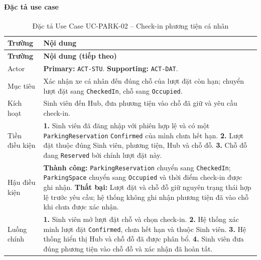 \paragraph{Đặc tả use case}
\small
\begin{longtable}{|L{26mm}|L{118mm}|}
  \caption{Đặc tả Use Case UC-PARK-02 -- Check-in phương tiện cá nhân}\label{tab:spec-UC-PARK-02}\\
  \hline
  \centering\arraybackslash\textbf{Trường} & \centering\arraybackslash\textbf{Nội dung}\\
  \hline
  \endfirsthead
  \hline
  \centering\arraybackslash\textbf{Trường} & \centering\arraybackslash\textbf{Nội dung (tiếp theo)}\\
  \hline
  \endhead
  Actor & \textbf{Primary:} \texttt{ACT-STU}. \textbf{Supporting:} \texttt{ACT-DAT}.\\\hline
  Mục tiêu & Xác nhận xe cá nhân đến đúng chỗ của lượt đặt còn hạn; chuyển lượt đặt sang \texttt{CheckedIn}, chỗ sang \texttt{Occupied}.\\\hline
  Kích hoạt & Sinh viên đến Hub, đưa phương tiện vào chỗ đã giữ và yêu cầu check-in.\\\hline
  Tiền điều kiện &
    \textbf{1.} Sinh viên đã đăng nhập với phiên hợp lệ và có một \texttt{ParkingReservation} \texttt{Confirmed} của mình chưa hết hạn.\newline
    \textbf{2.} Lượt đặt thuộc đúng Sinh viên, phương tiện, Hub và chỗ đỗ.\newline
    \textbf{3.} Chỗ đỗ đang \texttt{Reserved} bởi chính lượt đặt này.\\\hline
  Hậu điều kiện &
    \textbf{Thành công:} \texttt{ParkingReservation} chuyển sang \texttt{CheckedIn}; \texttt{ParkingSpace} chuyển sang \texttt{Occupied} và thời điểm check-in được ghi nhận.\newline
    \textbf{Thất bại:} Lượt đặt và chỗ đỗ giữ nguyên trạng thái hợp lệ trước yêu cầu; hệ thống không ghi nhận phương tiện đã vào chỗ khi chưa được xác nhận.\\\hline
  Luồng chính &
    \textbf{1.} Sinh viên mở lượt đặt chỗ và chọn check-in.\newline
    \textbf{2.} Hệ thống xác minh lượt đặt \texttt{Confirmed}, chưa hết hạn và thuộc Sinh viên.\newline
    \textbf{3.} Hệ thống hiển thị Hub và chỗ đỗ đã được phân bổ.\newline
    \textbf{4.} Sinh viên đưa đúng phương tiện vào chỗ đỗ và xác nhận đã hoàn tất.\newline

\end{longtable}
